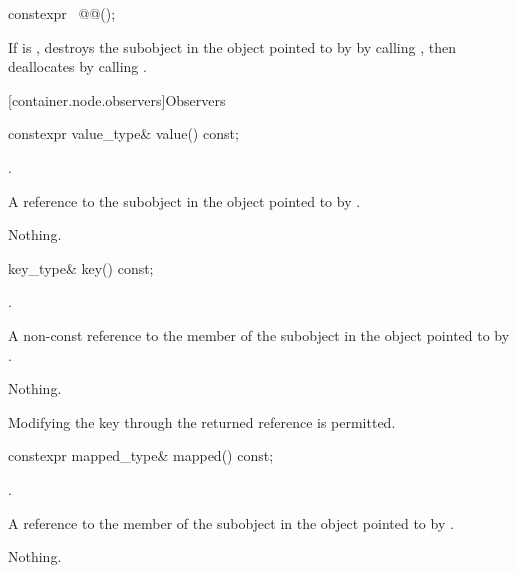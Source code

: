 \begin{itemdecl}
constexpr ~@@();
\end{itemdecl}

\begin{itemdescr}
\pnum
\effects
If  is , destroys the  subobject
in the  object pointed to by  by calling
, then deallocates  by calling
.
\end{itemdescr}

[container.node.observers]{Observers}

\begin{itemdecl}
constexpr value_type& value() const;
\end{itemdecl}

\begin{itemdescr}
\pnum
\expects
{}.

\pnum
\returns
A reference to the  subobject in the
 object pointed to by .

\pnum
\throws
Nothing.
\end{itemdescr}

\begin{itemdecl}
key_type& key() const;
\end{itemdecl}

\begin{itemdescr}
\pnum
\expects
{}.

\pnum
\returns
A non-const reference to the  member of the
 subobject in the  object
pointed to by .

\pnum
\throws
Nothing.

\pnum
\remarks
Modifying the key through the returned reference is permitted.
\end{itemdescr}

\begin{itemdecl}
constexpr mapped_type& mapped() const;
\end{itemdecl}

\begin{itemdescr}
\pnum
\expects
{}.

\pnum
\returns
A reference to the  member of the
 subobject in the  object
pointed to by .

\pnum
\throws
Nothing.
\end{itemdescr}

